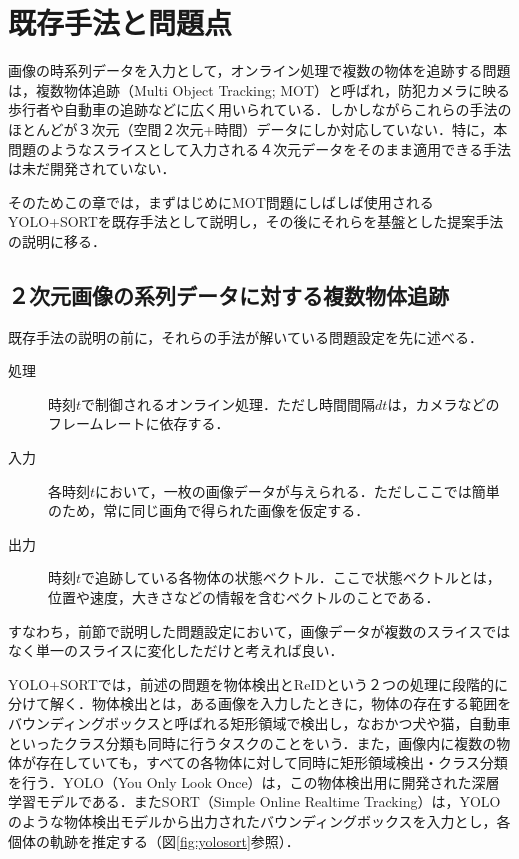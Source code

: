 \thispagestyle{fancy2}

\section{既存手法と問題点}
画像の時系列データを入力として，オンライン処理で複数の物体を追跡する問題は，複数物体追跡（Multi Object Tracking; MOT）と呼ばれ\cite{luo2021multiple}，防犯カメラに映る歩行者や自動車の追跡などに広く用いられている．しかしながらこれらの手法のほとんどが３次元（空間２次元+時間）データにしか対応していない．特に，本問題のようなスライスとして入力される４次元データをそのまま適用できる手法は未だ開発されていない．
\par
そのためこの章では，まずはじめにMOT問題にしばしば使用されるYOLO+SORT\cite{redmon2016you,alif2024yolov1,bewley2016simple}を既存手法として説明し，その後にそれらを基盤とした提案手法の説明に移る．

\subsection{２次元画像の系列データに対する複数物体追跡}
既存手法の説明の前に，それらの手法が解いている問題設定を先に述べる．
\begin{description}
    \item[処理] 時刻$t$で制御されるオンライン処理．ただし時間間隔$dt$は，カメラなどのフレームレートに依存する．
    \item[入力] 各時刻$t$において，一枚の画像データが与えられる．ただしここでは簡単のため，常に同じ画角で得られた画像を仮定する．
    \item[出力] 時刻$t$で追跡している各物体の状態ベクトル．ここで状態ベクトルとは，位置や速度，大きさなどの情報を含むベクトルのことである．
\end{description}
すなわち，前節で説明した問題設定において，画像データが複数のスライスではなく単一のスライスに変化しただけと考えれば良い．
\par
YOLO+SORTでは，前述の問題を物体検出とReIDという２つの処理に段階的に分けて解く．物体検出とは，ある画像を入力したときに，物体の存在する範囲をバウンディングボックスと呼ばれる矩形領域で検出し，なおかつ犬や猫，自動車といったクラス分類も同時に行うタスクのことをいう．また，画像内に複数の物体が存在していても，すべての各物体に対して同時に矩形領域検出・クラス分類を行う．YOLO（You Only Look Once）は，この物体検出用に開発された深層学習モデルである．またSORT（Simple Online Realtime Tracking）は，YOLOのような物体検出モデルから出力されたバウンディングボックスを入力とし，各個体の軌跡を推定する（図\ref{fig:yolosort}参照）．


